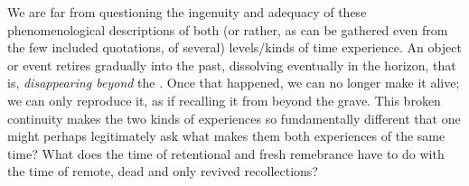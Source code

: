 \pa\label{pa:twoTimes} We are far from questioning the ingenuity and adequacy of
these phenomenological descriptions of both (or rather, as can be gathered even
from the few included quotations, of several) levels/kinds of time experience.
%
An  {object} or event retires gradually into the past, dissolving eventually in the horizon, that is, {\em
  disappearing beyond} the \hoa. Once that happened, we can no longer make it
 alive; we can only reproduce it, as if recalling it from beyond
the grave. This broken continuity makes the two kinds of experiences so
fundamentally different that one might perhaps legitimately ask what makes them
both experiences of the same time? What does the time of retentional
 and fresh remebrance have to do with the time of remote, dead and
only revived recollections?

